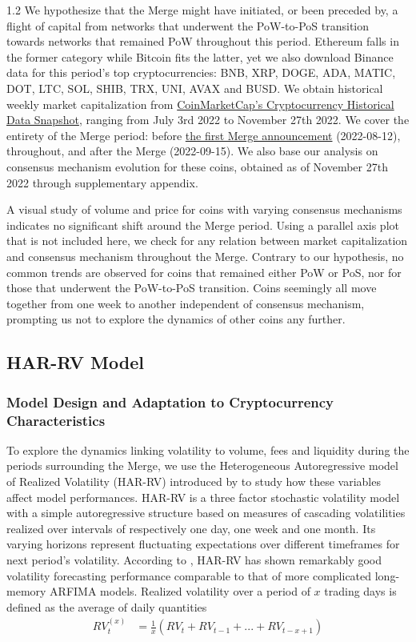 \documentclass[10pt]{article}
\begin{document}
\begin{setstretch}{1.2}
We hypothesize that the Merge might have initiated, or been preceded by, a flight of capital from networks that underwent the PoW-to-PoS transition towards networks that remained PoW throughout this period. Ethereum falls in the former category while Bitcoin fits the latter, yet we also download Binance data for this period's top cryptocurrencies: BNB, XRP, DOGE, ADA, MATIC, DOT, LTC, SOL, SHIB, TRX, UNI, AVAX and BUSD. We obtain historical weekly market capitalization from \href{https://coinmarketcap.com/historical/}{CoinMarketCap's Cryptocurrency Historical Data Snapshot}, ranging from July 3rd 2022 to November 27th 2022. We cover the entirety of the Merge period: before \href{https://blog.ethereum.org/2022/08/12/finalized-no-36}{the first Merge announcement} (2022-08-12), throughout, and after the Merge (2022-09-15). We also base our analysis on consensus mechanism evolution for these coins, obtained as of November 27th 2022 through \textcite{AmoussouGuenou2024} supplementary appendix. 

A visual study of volume and price for coins with varying consensus mechanisms indicates no significant shift around the Merge period. Using a parallel axis plot that is not included here, we check for any relation between market capitalization and consensus mechanism throughout the Merge. Contrary to our hypothesis, no common trends are observed for coins that remained either PoW or PoS, nor for those that underwent the PoW-to-PoS transition. Coins seemingly all move together from one week to another independent of consensus mechanism, prompting us not to explore the dynamics of other coins any further.

    \subsection{HAR-RV Model}
    \label{sec:harrv}
        \subsubsection{Model Design and Adaptation to Cryptocurrency Characteristics}
        \label{sec:4.2.1}

To explore the dynamics linking volatility to volume, fees and liquidity during the periods surrounding the Merge, we use the Heterogeneous Autoregressive model of Realized Volatility (HAR-RV) introduced by \textcite{Corsi2009} to study how these variables affect model performances. HAR-RV is a three factor stochastic volatility model with a simple autoregressive structure based on measures of cascading volatilities realized over intervals of respectively one day, one week and one month. Its varying horizons represent fluctuating expectations over different timeframes for next period's volatility. According to \textcite{Andersen2007}, HAR-RV has shown remarkably good volatility forecasting performance comparable to that of more complicated long-memory ARFIMA models. Realized volatility over a period of $x$ trading days is defined as the average of daily quantities
\begin{align}
RV_t^{(x)}&=\frac{1}{x}\left(RV_t + RV_{t-1} + ... +  RV_{t-x+1} \right) \tag{13}
\label{eq:averages}
\end{align}


\end{setstretch}
\end{document}
